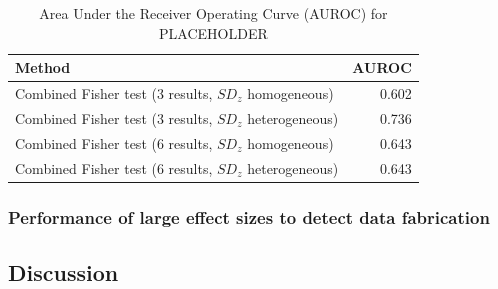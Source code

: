 \documentclass{article}
\begin{document}
\begin{table}[ht]
\centering
\begin{tabular}{lr}
  \hline
Method & AUROC \\ 
  \hline
Combined Fisher test (3 results, $SD_z$ homogeneous) & 0.602 \\ 
  Combined Fisher test (3 results, $SD_z$ heterogeneous) & 0.736 \\ 
  Combined Fisher test (6 results, $SD_z$ homogeneous) & 0.643 \\ 
  Combined Fisher test (6 results, $SD_z$ heterogeneous) & 0.643 \\ 
   \hline
\end{tabular}
\caption{Area Under the Receiver Operating Curve (AUROC) for PLACEHOLDER} 
\label{auroc_combined}
\end{table}

\subsubsection*{Performance of large effect sizes to detect data fabrication}




\subsection*{Discussion}





\end{document}
